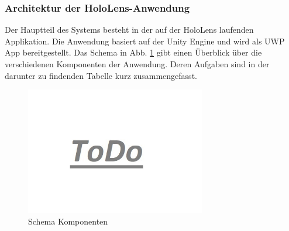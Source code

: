 \subsubsection{Architektur der HoloLens-Anwendung}
\label{sec-5-1-2}
Der Hauptteil des Systems besteht in der auf der HoloLens laufenden Applikation. Die Anwendung basiert auf der Unity Engine und wird als UWP App bereitgestellt. Das Schema in Abb. \ref{img:components-schema} gibt einen Überblick über die verschiedenen Komponenten der Anwendung. Deren Aufgaben sind in der darunter zu findenden Tabelle kurz zusammengefasst.

\begin{figure}[H]
	\centering
	\includegraphics[width=0.7\textwidth]{images/todo.jpg}
	\caption{Schema Komponenten}
	\label{img:components-schema}
\end{figure}


